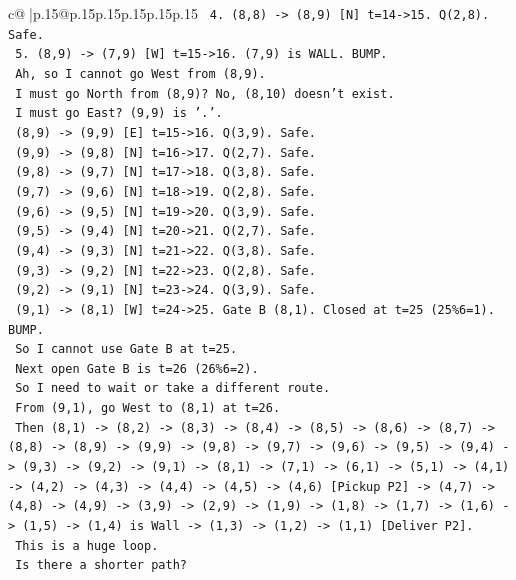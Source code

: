 \documentclass{article}
\begin{document}
{\begin{supertabular}{c@{$\;$}|p{.15\linewidth}@{}p{.15\linewidth}p{.15\linewidth}p{.15\linewidth}p{.15\linewidth}p{.15\linewidth}}
{{{\texttt{  4. (8,8) {-}> (8,9) {[}N{]} t=14{-}>15. Q(2,8). Safe.} \\
\texttt{  5. (8,9) {-}> (7,9) {[}W{]} t=15{-}>16. (7,9) is WALL. BUMP.} \\
\texttt{  Ah, so I cannot go West from (8,9).} \\
\texttt{  I must go North from (8,9)? No, (8,10) doesn't exist.} \\
\texttt{  I must go East? (9,9) is '.'.} \\
\texttt{  (8,9) {-}> (9,9) {[}E{]} t=15{-}>16. Q(3,9). Safe.} \\
\texttt{  (9,9) {-}> (9,8) {[}N{]} t=16{-}>17. Q(2,7). Safe.} \\
\texttt{  (9,8) {-}> (9,7) {[}N{]} t=17{-}>18. Q(3,8). Safe.} \\
\texttt{  (9,7) {-}> (9,6) {[}N{]} t=18{-}>19. Q(2,8). Safe.} \\
\texttt{  (9,6) {-}> (9,5) {[}N{]} t=19{-}>20. Q(3,9). Safe.} \\
\texttt{  (9,5) {-}> (9,4) {[}N{]} t=20{-}>21. Q(2,7). Safe.} \\
\texttt{  (9,4) {-}> (9,3) {[}N{]} t=21{-}>22. Q(3,8). Safe.} \\
\texttt{  (9,3) {-}> (9,2) {[}N{]} t=22{-}>23. Q(2,8). Safe.} \\
\texttt{  (9,2) {-}> (9,1) {[}N{]} t=23{-}>24. Q(3,9). Safe.} \\
\texttt{  (9,1) {-}> (8,1) {[}W{]} t=24{-}>25. Gate B (8,1). Closed at t=25 (25\%6=1). BUMP.} \\
\texttt{  So I cannot use Gate B at t=25.} \\
\texttt{  Next open Gate B is t=26 (26\%6=2).} \\
\texttt{  So I need to wait or take a different route.} \\
\texttt{  From (9,1), go West to (8,1) at t=26.} \\
\texttt{  Then (8,1) {-}> (8,2) {-}> (8,3) {-}> (8,4) {-}> (8,5) {-}> (8,6) {-}> (8,7) {-}> (8,8) {-}> (8,9) {-}> (9,9) {-}> (9,8) {-}> (9,7) {-}> (9,6) {-}> (9,5) {-}> (9,4) {-}> (9,3) {-}> (9,2) {-}> (9,1) {-}> (8,1) {-}> (7,1) {-}> (6,1) {-}> (5,1) {-}> (4,1) {-}> (4,2) {-}> (4,3) {-}> (4,4) {-}> (4,5) {-}> (4,6) {[}Pickup P2{]} {-}> (4,7) {-}> (4,8) {-}> (4,9) {-}> (3,9) {-}> (2,9) {-}> (1,9) {-}> (1,8) {-}> (1,7) {-}> (1,6) {-}> (1,5) {-}> (1,4) is Wall {-}> (1,3) {-}> (1,2) {-}> (1,1) {[}Deliver P2{]}.} \\
\texttt{  This is a huge loop.} \\
\texttt{  Is there a shorter path?} \\
}}}
\end{supertabular}}
\end{document}
